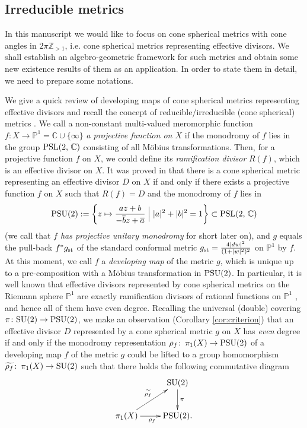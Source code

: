 \documentclass[12pt]{article}
\begin{document}
\subsection{Irreducible  metrics}
In this manuscript we would like to focus on cone spherical metrics with cone angles in $2\pi \mathbb{Z}_{>1}$, i.e. cone spherical metrics representing effective divisors. We shall establish an algebro-geometric framework for such metrics and obtain some new existence results of them as an application. In order to state them in detail, we need to prepare some notations.

We give a quick review of developing maps of cone spherical metrics representing effective divisors and recall the concept of reducible/irreducible (cone spherical) metrics \cite{CWWX2015, Er04, UY2000}. We call a non-constant multi-valued meromorphic function $f \colon X \to \mathbb{P}^1=\mathbb{C}\cup \{\infty\}$ {\it a projective function on $X$} if the monodromy of $f$ lies in the group ${\rm PSL}(2,\,\mathbb{C})$ consisting of all M{\" o}bius transformations. Then, for a projective function $f$ on $X$, we could define its {\it ramification divisor} $R(f)$, which is an effective divisor on $X$. It was proved in \cite[Section 3]{CWWX2015} that there is a cone spherical metric representing an effective divisor $D$ on $X$ if and only if there exists a projective function $f$ on $X$ such that $R(f)=D$ and the monodromy of $f$ lies in
\[ {\rm PSU(2)}:=\left\{ z \mapsto \frac{az+b}{-\overline{b}z + \overline{a}} \; \Big| \; |a|^2 + |b|^2 = 1 \right\} \subset {\rm PSL}(2,\,\mathbb{C}) \]
(we call that {\it $f$ has projective unitary monodromy} for short later on), and $g$ equals the pull-back $f^*g_{\rm st}$ of the standard conformal metric $g_{\rm st}=\frac{4|dw|^2}{(1+|w|^2)^2}$ on $\mathbb{P}^{1}$ by $f$. At this moment, we call $f$ a {\it developing map} of the metric $g$, which is unique up to a pre-composition with a M{\" o}bius transformation in ${\rm PSU}(2)$. In particular,  it is well known that effective divisors represented by cone spherical metrics on the Riemann sphere $\mathbb{P}^1$ are exactly ramification divisors of rational functions on $\mathbb{P}^1$ \cite[Theorem 1.9]{CWWX2015}, and hence all of them have even degree. Recalling the universal (double) covering $\pi \colon {\rm SU(2)}\to {\rm PSU(2)}$, we make an observation (Corollary \ref{cor:criterion}) that an effective divisor $D$ represented by a cone spherical metric $g$ on $X$ has {\it even} degree if and only if the monodromy representation $\rho_f \colon \, \pi_1(X) \to {\rm PSU(2)}$ of a developing map $f$ of the metric $g$ could be lifted to a group homomorphism $\widetilde{\rho_f} \colon \, \pi_1(X) \to {\rm SU}(2)$ such that there holds the following commutative diagram
\[ \xymatrix{
                                                                                   & {\rm SU(2)} \ar[d] ^{\pi} \\
\pi_{1}(X) \ar[ru]^{\widetilde{\rho_f}} \ar[r]_{\rho_{f}} & {\rm PSU(2)}.
}\]
\end{document}
